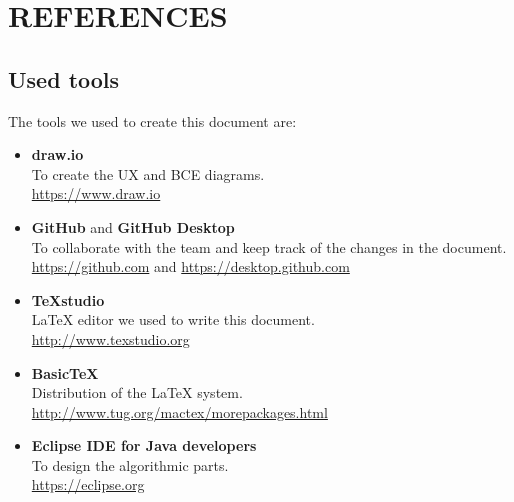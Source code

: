 \section{REFERENCES}
\subsection{Used tools}
The tools we used to create this document are:
\begin{itemize}
	\item \textbf{draw.io} \\
	To create the UX and BCE diagrams.\\
	\url{https://www.draw.io}
	\item \textbf{GitHub} and \textbf{GitHub Desktop} \\
	To collaborate with the team and keep track of the changes in the document. \\
	\url{https://github.com} and \url{https://desktop.github.com}
	\item \textbf{TeXstudio} \\
	LaTeX editor we used to write this document. \\
	\url{http://www.texstudio.org}
	\item \textbf{BasicTeX} \\
	Distribution of the LaTeX system. \\
	\url{http://www.tug.org/mactex/morepackages.html}
	\item \textbf{Eclipse IDE for Java developers}\\
	To design the algorithmic parts.\\
	\url{https://eclipse.org}
\end{itemize}